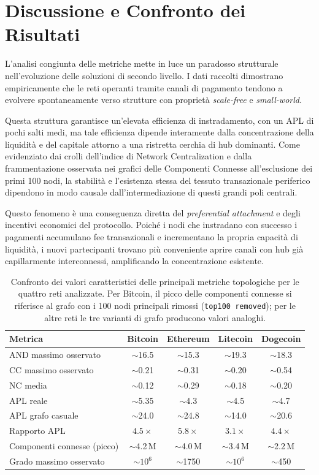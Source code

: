 \documentclass[12pt,a4paper,oneside]{book}
\begin{document}
\chapter{Discussione e Confronto dei Risultati}
L'analisi congiunta delle metriche mette in luce un paradosso strutturale nell'evoluzione delle soluzioni di secondo livello. I dati raccolti dimostrano empiricamente che le reti operanti tramite canali di pagamento tendono a evolvere spontaneamente verso strutture con proprietà \textit{scale-free} e \textit{small-world}.

Questa struttura garantisce un'elevata efficienza di instradamento, con un APL di pochi salti medi, ma tale efficienza dipende interamente dalla concentrazione della liquidità e del capitale attorno a una ristretta cerchia di hub dominanti. Come evidenziato dai crolli dell'indice di Network Centralization e dalla frammentazione osservata nei grafici delle Componenti Connesse all'esclusione dei primi 100 nodi, la stabilità e l'esistenza stessa del tessuto transazionale periferico dipendono in modo causale dall'intermediazione di questi grandi poli centrali.

Questo fenomeno è una conseguenza diretta del \textit{preferential attachment} e degli incentivi economici del protocollo. Poiché i nodi che instradano con successo i pagamenti accumulano fee transazionali e incrementano la propria capacità di liquidità, i nuovi partecipanti trovano più conveniente aprire canali con hub già capillarmente interconnessi, amplificando la concentrazione esistente.

\begin{table}[htbp]
\centering
\small
\begin{tabular}{@{}lcccc@{}}
\toprule
Metrica & Bitcoin & Ethereum & Litecoin & Dogecoin \\
\midrule
AND massimo osservato & $\sim$16.5 & $\sim$15.3 & $\sim$19.3 & $\sim$18.3 \\
CC massimo osservato & $\sim$0.21 & $\sim$0.31 & $\sim$0.20 & $\sim$0.54 \\
NC media & $\sim$0.12 & $\sim$0.29 & $\sim$0.18 & $\sim$0.20 \\
APL reale & $\sim$5.35 & $\sim$4.3 & $\sim$4.5 & $\sim$4.7 \\
APL grafo casuale & $\sim$24.0 & $\sim$24.8 & $\sim$14.0 & $\sim$20.6 \\
Rapporto APL & $4.5\times$ & $5.8\times$ & $3.1\times$ & $4.4\times$ \\
Componenti connesse (picco) & $\sim$4.2\,M & $\sim$4.0\,M & $\sim$3.4\,M & $\sim$2.2\,M \\
Grado massimo osservato & $\sim$$10^6$ & $\sim$1750 & $\sim$$10^6$ & $\sim$450 \\
\bottomrule
\end{tabular}
\caption{Confronto dei valori caratteristici delle principali metriche topologiche per le quattro reti analizzate. Per Bitcoin, il picco delle componenti connesse si riferisce al grafo con i 100 nodi principali rimossi (\texttt{top100 removed}); per le altre reti le tre varianti di grafo producono valori analoghi.}
\label{tab:comparazione}
\end{table}
\end{document}
